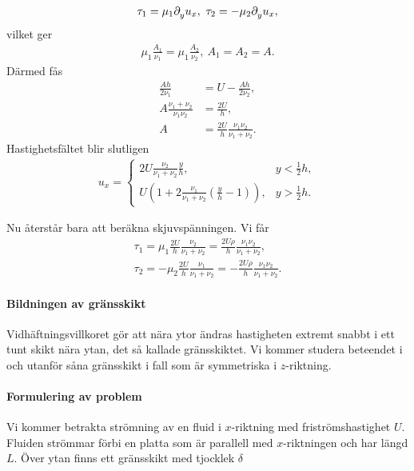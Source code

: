 \begin{align*}
	\tau_{1} = \mu_{1}\partial_{y}^{}u_{x},\ \tau_{2} = -\mu_{2}\partial_{y}^{}u_{x},
\end{align*}
vilket ger
\begin{align*}
	\mu_{1}\frac{A_{1}}{\nu_{1}} = \mu_{1}\frac{A_{2}}{\nu_{2}},\ A_{1} = A_{2} = A.
\end{align*}
Därmed fås
\begin{align*}
	\frac{Ah}{2\nu_{1}}                       &= U - \frac{Ah}{2\nu_{2}}, \\
	A\frac{\nu_{1} + \nu_{2}}{\nu_{1}\nu_{2}} &= \frac{2U}{h}, \\
	A                                         &= \frac{2U}{h}\frac{\nu_{1}\nu_{2}}{\nu_{1} + \nu_{2}}.
\end{align*}
Hastighetsfältet blir slutligen
\begin{align*}
	u_{x} =
	\begin{cases}
		2U\frac{\nu_{2}}{\nu_{1} + \nu_{2}}\frac{y}{h},                                   & y < \frac{1}{2}h, \\
		U\left(1 + 2\frac{\nu_{1}}{\nu_{1} + \nu_{2}}\left(\frac{y}{h} - 1\right)\right), & y > \frac{1}{2}h.
	\end{cases}
\end{align*}

Nu återstår bara att beräkna skjuvspänningen. Vi får
\begin{align*}
	\tau_{1} = \mu_{1}\frac{2U}{h}\frac{\nu_{2}}{\nu_{1} + \nu_{2}} = \frac{2U\rho}{h}\frac{\nu_{1}\nu_{2}}{\nu_{1} + \nu_{2}}, \\
	\tau_{2} = -\mu_{2}\frac{2U}{h}\frac{\nu_{1}}{\nu_{1} + \nu_{2}} = -\frac{2U\rho}{h}\frac{\nu_{1}\nu_{2}}{\nu_{1} + \nu_{2}}.
\end{align*}

\paragraph{Bildningen av gränsskikt}
Vidhäftningsvillkoret gör att nära ytor ändras hastigheten extremt snabbt i ett tunt skikt nära ytan, det så kallade gränsskiktet. Vi kommer studera beteendet i och utanför såna gränsskikt i fall som är symmetriska i $z$-riktning.

\paragraph{Formulering av problem}
Vi kommer betrakta strömning av en fluid i $x$-riktning med friströmshastighet $U$. Fluiden strömmar förbi en platta som är parallell med $x$-riktningen och har längd $L$. Över ytan finns ett gränsskikt med tjocklek $\delta$

